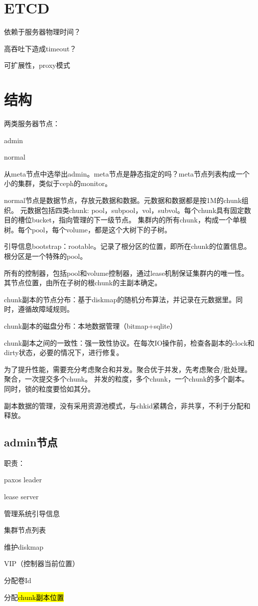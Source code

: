 \section{ETCD}

依赖于服务器物理时间？

高吞吐下造成timeout？

可扩展性，proxy模式

\section{结构}

两类服务器节点：
\begin{compactenum}
\item admin
\item normal
\end{compactenum}

从meta节点中选举出admin。meta节点是静态指定的吗？meta节点列表构成一个小的集群，类似于ceph的monitor。

normal节点是数据节点，存放元数据和数据。元数据和数据都是按1M的chunk组织。
元数据包括四类chunk: pool，subpool，vol，subvol。每个chunk具有固定数目的槽位bucket，指向管理的下一级节点。
集群内的所有chunk，构成一个单根树。每个pool，每个volume，都是这个大树下的子树。

引导信息bootstrap：rootable。记录了根分区的位置，即所在chunk的位置信息。根分区是一个特殊的pool。

所有的控制器，包括pool和volume控制器，通过lease机制保证集群内的唯一性。
其节点位置，由所在子树的根chunk的主副本确定。

chunk副本的节点分布：基于diskmap的随机分布算法，并记录在元数据里。同时，遵循故障域规则。

chunk副本的磁盘分布：本地数据管理（bitmap+sqlite）

chunk副本之间的一致性：强一致性协议。在每次IO操作前，检查各副本的clock和dirty状态，必要的情况下，进行修复。

为了提升性能，需要充分考虑聚合和并发。聚合优于并发，先考虑聚合/批处理。
聚合，一次提交多个chunk。
并发的粒度，多个chunk，一个chunk的多个副本。同时，锁的粒度要恰如其分。

副本数据的管理，没有采用资源池模式，与chkid紧耦合，非共享，不利于分配和释放。

\subsection{admin节点}

职责：
\begin{compactenum}
\item paxos leader
\item lease server
\item 管理系统引导信息
\item 集群节点列表
\item 维护diskmap
\item VIP（控制器当前位置）
\item 分配卷Id
\item 分配\hl{chunk副本位置}
\end{compactenum}

